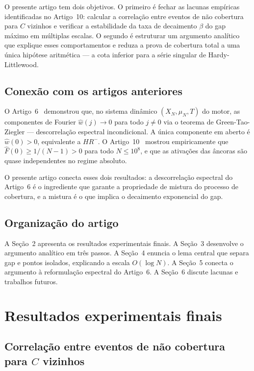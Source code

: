 \documentclass[11pt]{article}
\theoremstyle{definition}
\begin{document}
	O presente artigo tem dois objetivos. O primeiro é fechar as lacunas empíricas identificadas no Artigo~10: calcular a correlação entre eventos de não cobertura para $C$ vizinhos e verificar a estabilidade da taxa de decaimento $\beta$ do gap máximo em múltiplas escalas. O segundo é estruturar um argumento analítico que explique esses comportamentos e reduza a prova de cobertura total a uma única hipótese aritmética — a cota inferior para a série singular de Hardy-Littlewood.
	
	\subsection{Conexão com os artigos anteriores}
	
	O Artigo~6~\cite{art6} demonstrou que, no sistema dinâmico $(X_N,\mu_N,T)$ do motor, as componentes de Fourier $\widehat{w}(j)\to 0$ para todo $j\neq 0$ via o teorema de Green-Tao-Ziegler — descorrelação espectral incondicional. A única componente em aberto é $\widehat{w}(0)>0$, equivalente a $HR^-$. O Artigo~10~\cite{art10} mostrou empiricamente que $\widehat{F}(0)\ge 1/(N-1)>0$ para todo $N\le 10^8$, e que as ativações das âncoras são quase independentes no regime absoluto.
	
	O presente artigo conecta esses dois resultados: a descorrelação espectral do Artigo~6 é o ingrediente que garante a propriedade de mistura do processo de cobertura, e a mistura é o que implica o decaimento exponencial do gap.
	
	\subsection{Organização do artigo}
	
	A Seção~2 apresenta os resultados experimentais finais. A Seção~3 desenvolve o argumento analítico em três passos. A Seção~4 enuncia o lema central que separa gap e pontos isolados, explicando a escala $O(\log N)$. A Seção~5 conecta o argumento à reformulação espectral do Artigo~6. A Seção~6 discute lacunas e trabalhos futuros.
	
	\section{Resultados experimentais finais}
	
	\subsection{Correlação entre eventos de não cobertura para $C$ vizinhos}
	
\end{document}
